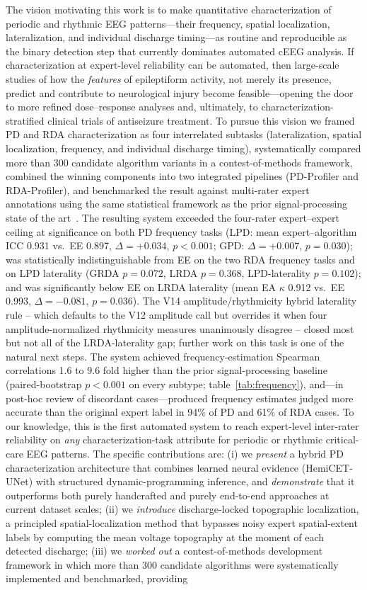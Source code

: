 \documentclass{iopjournal}
\begin{document}
The vision motivating this work is to make quantitative characterization of periodic and rhythmic EEG patterns---their frequency, spatial localization, lateralization, and individual discharge timing---as routine and reproducible as the binary detection step that currently dominates automated cEEG analysis. If characterization at expert-level reliability can be automated, then large-scale studies of how the \emph{features} of epileptiform activity, not merely its presence, predict and contribute to neurological injury become feasible---opening the door to more refined dose--response analyses and, ultimately, to characterization-stratified clinical trials of antiseizure treatment. To pursue this vision we framed PD and RDA characterization as four interrelated subtasks (lateralization, spatial localization, frequency, and individual discharge timing), systematically compared more than 300 candidate algorithm variants in a contest-of-methods framework, combined the winning components into two integrated pipelines (PD-Profiler and RDA-Profiler), and benchmarked the result against multi-rater expert annotations using the same statistical framework as the prior signal-processing state of the art~\cite{tautan2025}. The resulting system exceeded the four-rater expert--expert ceiling at significance on both PD frequency tasks (LPD: mean expert--algorithm ICC 0.931 vs.\ EE 0.897, $\Delta=+0.034$, $p<0.001$; GPD: $\Delta=+0.007$, $p=0.030$); was statistically indistinguishable from EE on the two RDA frequency tasks and on LPD laterality (GRDA $p=0.072$, LRDA $p=0.368$, LPD-laterality $p=0.102$); and was significantly below EE on LRDA laterality (mean EA $\kappa$ 0.912 vs.\ EE 0.993, $\Delta=-0.081$, $p=0.036$). The V14 amplitude/rhythmicity hybrid laterality rule -- which defaults to the V12 amplitude call but overrides it when four amplitude-normalized rhythmicity measures unanimously disagree -- closed most but not all of the LRDA-laterality gap; further work on this task is one of the natural next steps. The system achieved frequency-estimation Spearman correlations 1.6 to 9.6 fold higher than the prior signal-processing baseline (paired-bootstrap $p<0.001$ on every subtype; table~\ref{tab:frequency}), and---in post-hoc review of discordant cases---produced frequency estimates judged more accurate than the original expert label in 94\% of PD and 61\% of RDA cases. To our knowledge, this is the first automated system to reach expert-level inter-rater reliability on \emph{any} characterization-task attribute for periodic or rhythmic critical-care EEG patterns. The specific contributions are: (i) we \emph{present} a hybrid PD characterization architecture that combines learned neural evidence (HemiCET-UNet) with structured dynamic-programming inference, and \emph{demonstrate} that it outperforms both purely handcrafted and purely end-to-end approaches at current dataset scales; (ii) we \emph{introduce} discharge-locked topographic localization, a principled spatial-localization method that bypasses noisy expert spatial-extent labels by computing the mean voltage topography at the moment of each detected discharge; (iii) we \emph{worked out} a contest-of-methods development framework in which more than 300 candidate algorithms were systematically implemented and benchmarked, providing 
\end{document}
